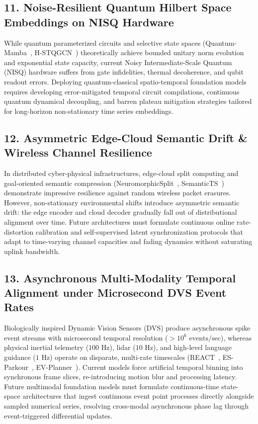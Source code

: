\subsection{11. Noise-Resilient Quantum Hilbert Space Embeddings on NISQ Hardware}
While quantum parameterized circuits and selective state spaces (Quantum-Mamba~\cite{Jura2025QuantumSSM}, H-STQGCN~\cite{Zhang2025HSTQGCN}) theoretically achieve bounded unitary norm evolution and exponential state capacity, current Noisy Intermediate-Scale Quantum (NISQ) hardware suffers from gate infidelities, thermal decoherence, and qubit readout errors. Deploying quantum-classical spatio-temporal foundation models requires developing error-mitigated temporal circuit compilations, continuous quantum dynamical decoupling, and barren plateau mitigation strategies tailored for long-horizon non-stationary time series embeddings.

\subsection{12. Asymmetric Edge-Cloud Semantic Drift \& Wireless Channel Resilience}
In distributed cyber-physical infrastructures, edge-cloud split computing and goal-oriented semantic compression (NeuromorphicSplit~\cite{Wu2025NeuromorphicSplit}, SemanticTS~\cite{Sun2025SemanticTS}) demonstrate impressive resilience against random wireless packet erasures. However, non-stationary environmental shifts introduce asymmetric semantic drift: the edge encoder and cloud decoder gradually fall out of distributional alignment over time. Future architectures must formulate continuous online rate-distortion calibration and self-supervised latent synchronization protocols that adapt to time-varying channel capacities and fading dynamics without saturating uplink bandwidth.

\subsection{13. Asynchronous Multi-Modality Temporal Alignment under Microsecond DVS Event Rates}
Biologically inspired Dynamic Vision Sensors (DVS) produce asynchronous spike event streams with microsecond temporal resolution ($>10^6\text{ events/sec}$), whereas physical inertial telemetry ($100\text{ Hz}$), lidar ($10\text{ Hz}$), and high-level language guidance ($1\text{ Hz}$) operate on disparate, multi-rate timescales (REACT~\cite{Keime2026REACT}, ES-Parkour~\cite{Zhang2025ESParkour}, EV-Planner~\cite{Sanyal2023EVPlanner}). Current models force artificial temporal binning into synchronous frame slices, re-introducing motion blur and processing latency. Future multimodal foundation models must formulate continuous-time state-space architectures that ingest continuous event point processes directly alongside sampled numerical series, resolving cross-modal asynchronous phase lag through event-triggered differential updates.

